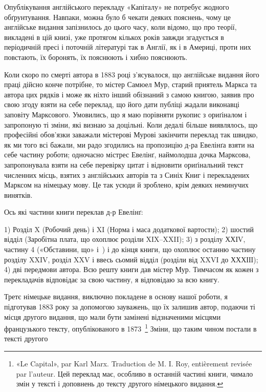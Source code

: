 
Опублікування англійського перекладу «Капіталу» не потребує жодного
обґрунтування. Навпаки, можна було б чекати деяких пояснень, чому це
англійське видання запізнилось до цього часу, коли відомо, що про теорії,
викладені в цій книзі, уже протягом кількох років завжди згадується в
періодичній пресі і поточній літературі так в Англії, як і в Америці,
проти них повстають, їх боронять, їх пояснюють і хибно пояснюють.

Коли скоро по смерті автора в 1883 році з’ясувалося, що англійське
видання його праці дійсно конче потрібне, то містер Самюел
Мур, старий приятель Маркса та автора цих рядків і може
як ніхто інший обізнаний з самою книгою, заявив про свою згоду
взяти на себе переклад, що його дати публіці жадали виконавці
заповіту Марксового. Умовились, що я маю порівняти рукопис з
ориґіналом і запропоную ті зміни, які визнаю за доцільні. Коли
дедалі більше виявлялось, що професійні обов’язки заважали
містерові Мурові закінчити переклад так швидко, як ми того всі
бажали, ми радо згодились на пропозицію д-ра Евелінґа взяти
на себе частину роботи; одночасно містрес Евелінґ, наймолодша
дочка Марксова, запропонувала взяти на себе перевірку цитат і
відновити ориґінальний текст численних місць, взятих з англійських
авторів та з Синіх Книг і перекладених Марксом на німецьку
мову. Це так усюди й зроблено, крім деяких неминучих винятків.

Ось які частини книги переклав д-р Евелінґ:

1) Розділ X (Робочий день) і XI (Норма і маса додаткової
вартости); 2) шостий відділ (Заробітна плата, що охоплює розділи
XIX--XXII); 3) з розділу ХХІV, частину 4 («Обставини, що»
і~) і до кінця книги, що охоплює останню частину розділу
XXIV, розділ XXV і ввесь сьомий відділ (розділи від XXVI
до ХХХІІІ); 4) дві передмови автора. Всю решту книги дав містер
Мур. Тимчасом як кожен з перекладачів відповідає за свою
частину, я відповідаю за всю книгу.

Третє німецьке видання, виключно покладене в основу нашої
роботи, я підготував 1883 року за допомогою зауважень, що їх
залишив автор, подаючи ті місця другого видання, що мали бути
замінені відзначеними місцями французького тексту, опублікованого
в 1873~\footnote*{
«Le Capital», par Karl Marx. Traduction de M. I. Roy, entièrement
revisée par l’auteur. Цей переклад має, особливо в останній частині книги,
чимало змін у тексті і доповнень до тексту другого німецького видання.
} Зміни, що таким чином постали в тексті другого
\parbreak{}  %
